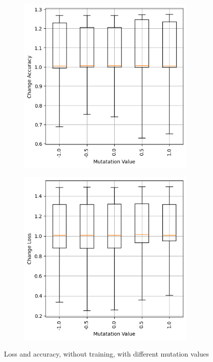 \begin{figure}
    \begin{subfigure}{0.5\textwidth}
        \centering
        \includegraphics[width=0.95\textwidth]{plots/MutatationValue_NotTrained_accuracy.png}
    \end{subfigure}
    \begin{subfigure}{0.5\textwidth}
        \centering
        \includegraphics[width=0.95\textwidth]{plots/MutatationValue_NotTrained_loss.png}
    \end{subfigure}
    \caption{Loss and accuracy, without training, with different mutation values}
    \label{fig:mutation-values-notraining}
\end{figure}